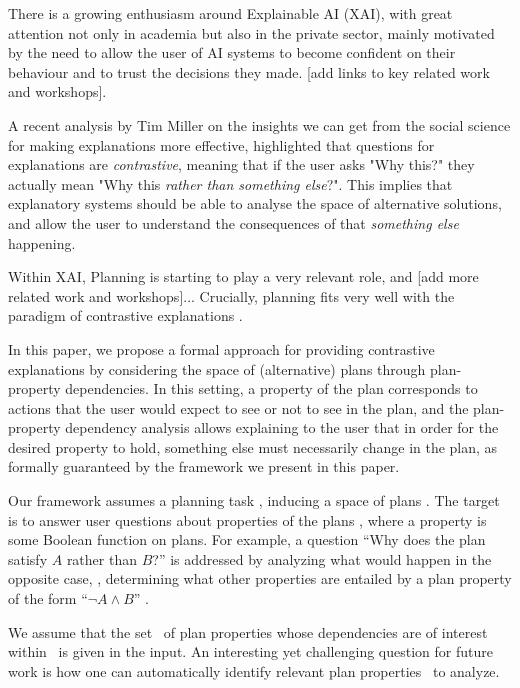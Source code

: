 There is a growing enthusiasm around Explainable AI (XAI), with great attention not only in academia but also in the private sector, mainly motivated by the need to allow the user of AI systems to become confident on their behaviour and to trust the decisions they made. [add links to key related work and workshops].

A recent analysis by Tim Miller on the insights we can get from the social science for making explanations more effective, highlighted that questions for explanations are \textit{contrastive}, meaning that if the user asks "Why this?" they actually mean "Why this \textit{rather than something else}?".
 This implies that explanatory systems should be able to analyse the space of alternative solutions, and allow the user to understand the consequences of that \textit{something else} happening.

Within XAI, Planning is starting to play a very relevant role, and [add more related work and workshops]...
Crucially, planning fits very well with the paradigm of contrastive explanations \cite{DBLP:journals/corr/abs-1709-10256, contrastive_miller}.

In this paper, we propose a formal approach for providing contrastive explanations by considering the space of (alternative) plans through plan-property dependencies. In this setting, a property of the plan corresponds to actions that the user would expect to see or not to see in the plan, and the plan-property dependency analysis allows explaining to the user that in order for the desired property to hold, something else must necessarily change in the plan, as formally guaranteed by the framework we present in this paper.

Our framework assumes a planning task \task, inducing a space of plans
\plans. The target is to answer user questions about properties of the
plans \plans, where a property is some Boolean function on plans. For
example, a question ``Why does the plan satisfy $A$ rather than $B$?''
is addressed by analyzing what would happen in the opposite case, \ie,
determining what other properties are entailed by a plan property of
the form ``$\neg A \wedge B$'' . 

%



We assume that the set \props\ of plan properties whose dependencies
are of interest within \plans\ is given in the input. An interesting
yet challenging question for future work is how one can automatically
identify relevant plan properties \props\ to analyze.

